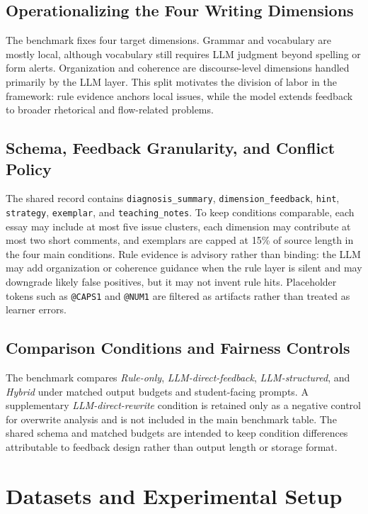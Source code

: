 \documentclass[preprint,12pt]{elsarticle}
\begin{document}
\subsection{Operationalizing the Four Writing Dimensions}

The benchmark fixes four target dimensions. Grammar and vocabulary are mostly local, although vocabulary still requires LLM judgment beyond spelling or form alerts. Organization and coherence are discourse-level dimensions handled primarily by the LLM layer. This split motivates the division of labor in the framework: rule evidence anchors local issues, while the model extends feedback to broader rhetorical and flow-related problems.

\subsection{Schema, Feedback Granularity, and Conflict Policy}

The shared record contains \texttt{diagnosis\_summary}, \texttt{dimension\_feedback}, \texttt{hint}, \texttt{strategy}, \texttt{exemplar}, and \texttt{teaching\_notes}. To keep conditions comparable, each essay may include at most five issue clusters, each dimension may contribute at most two short comments, and exemplars are capped at 15\% of source length in the four main conditions. Rule evidence is advisory rather than binding: the LLM may add organization or coherence guidance when the rule layer is silent and may downgrade likely false positives, but it may not invent rule hits. Placeholder tokens such as \texttt{@CAPS1} and \texttt{@NUM1} are filtered as artifacts rather than treated as learner errors.

\subsection{Comparison Conditions and Fairness Controls}

The benchmark compares \textit{Rule-only}, \textit{LLM-direct-feedback}, \textit{LLM-structured}, and \textit{Hybrid} under matched output budgets and student-facing prompts. A supplementary \textit{LLM-direct-rewrite} condition is retained only as a negative control for overwrite analysis and is not included in the main benchmark table. The shared schema and matched budgets are intended to keep condition differences attributable to feedback design rather than output length or storage format.

\section{Datasets and Experimental Setup}
\end{document}
